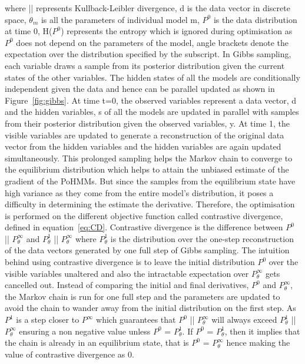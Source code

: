 \documentclass{sig-alternate}
\begin{document}
where || represents Kullback-Leibler divergence, d is the data vector in discrete space, $\theta_m$ is all the parameters of individual model m, $P^0$ is the data distribution at time $0$, H($P^0$) represents the entropy which is ignored during optimisation as $P^0$ does not depend on the parameters of the model, angle brackets denote the expectation over the distribution specified by the subscript.
In Gibbs sampling, each variable draws a sample from its posterior distribution given the current states of the other variables. The hidden states of all the models are conditionally independent given the data and hence can be parallel updated as shown in Figure~\ref{fig:gibbs}. At time t=0, the observed variables represent a data vector, d and the hidden variables, s of all the models are updated in parallel with samples from their posterior distribution given the observed variables, y. At time 1, the visible variables are updated to generate a reconstruction of the original data vector from the hidden variables and the hidden variables are again updated simultaneously. This prolonged sampling helps the Markov chain to converge to the equilibrium distribution which helps to attain the unbiased estimate of the gradient of the PoHMMs. But since the samples from the equilibrium state have high variance as they come from the entire model's distribution, it poses a difficulty in determining the estimate the derivative. Therefore, the optimisation is performed on the different objective function called contrastive divergence, defined in equation~\ref{eq:CD}. Contrastive divergence is the difference between $P^0$ || $P^\infty_\theta$ and $P^1_\theta$ || $P^\infty_\theta$ where $P^1_\theta$ is the distribution over the one-step reconstruction of the data vectors generated by one full step of Gibbs sampling. The intuition behind using contrastive divergence is to leave the initial distribution $P^{0}$ over the visible variables unaltered and also the intractable expectation over $P^\infty_\theta$ gets cancelled out. Instead of comparing the initial and final derivatives, $P^0$ and $P^\infty_\theta$, the Markov chain is run for one full step and the parameters are updated to avoid the chain to wander away from the initial distribution on the first step. As $P^1$ is a step closer to $P^\infty$ which guarantees that $P^0$ || $P^\infty_\theta$ will always exceed $P^1_\theta$ || $P^\infty_\theta$ ensuring a non negative value unless $P^0$ = $P^1_\theta$. If $P^0$ = $P^1_\theta$, then it implies that the chain is already in an equilibrium state, that is $P^0$ = $P^\infty_\theta$ hence making the value of contrastive divergence as $0$.
\end{document}
